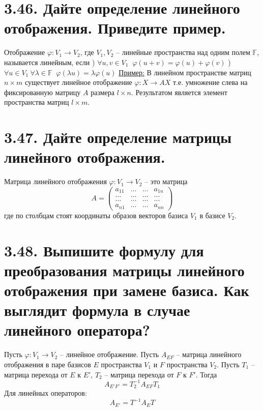 \documentclass{article}
\begin{document}
\section*{\LARGE 3.46. Дайте определение линейного отображения. Приведите пример.}
Отображение $\varphi : V_1 \rightarrow V_2$, где $V_1, V_2$ -- линейные пространства над одним полем $\mathbb{F}$, называется линейным, если
\newline{}) $\forall u,v \in V_1 \;\; \varphi(u + v) = \varphi(u) + \varphi(v)$
\newline{}) $\forall u \in V_1\:\forall \lambda \in \mathbb{F} \;\; \varphi(\lambda u) = \lambda \varphi(u)$
\newline \underline{Пример:}
\newline В линейном пространстве матриц $n \times m$ существует линейное отображение 
\newline $\varphi : X \rightarrow AX$ т.е. умножение слева на фиксированную матрицу $A$ размера $l \times n$. Результатом является элемент пространства матриц $l \times m$.

\section*{\LARGE 3.47. Дайте определение матрицы линейного отображения.}
Матрица линейного отображения $\varphi : V_1 \rightarrow V_2$ -- это матрица 
$$
A = 
\begin{pmatrix}
a_{11} & ... & ... & a_{1n} \\
... & ... & ... & ... \\
... & ... & ... & ... \\
a_{n1} & ... & ... & a_{nn} 
\end{pmatrix}
$$
где по столбцам стоят координаты образов векторов базиса $V_1$ в базисе $V_2$.

\section*{\LARGE 3.48. Выпишите формулу для преобразования матрицы линейного отображения при замене базиса. Как выглядит формула в случае линейного оператора?}
Пусть $\varphi : V_1 \rightarrow V_2$ -- линейное отображение. Пусть $A_{EF}$ -- матрица линейного отображения в паре базисов $E$ пространства $V_1$ и $F$ пространства $V_2$. Пусть $T_1$ -- матрица перехода от $E$ к $E'$, $T_2$ --  матрица перехода от $F$ к $F'$. Тогда 
$$
A_{E'F'} = T_2^{-1}A_{EF}T_1
$$
Для линейных операторов:
$$
A_{E'} = T^{-1}A_ET
$$
\end{document}
